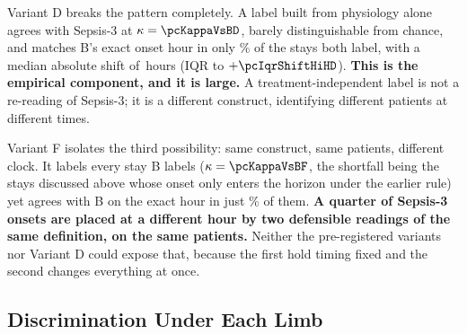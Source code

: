 Variant D breaks the pattern completely. A label built from physiology alone
agrees with Sepsis-3 at $\kappa = \pcKappaVsBD$, barely distinguishable from
chance, and matches B's exact onset hour in only \pcPctExactMatchD\% of the
stays both label, with a median absolute shift of \pcMedianAbsShiftHD\,hours
(IQR \pcIqrShiftLoHD{} to $+\pcIqrShiftHiHD$). \textbf{This is the empirical
component, and it is large.} A treatment-independent label is not a re-reading
of Sepsis-3; it is a different construct, identifying different patients at
different times.

Variant F isolates the third possibility: same construct, same patients,
different clock. It labels every stay B labels ($\kappa = \pcKappaVsBF$, the
shortfall being the \pcFNExtraInHorizon{} stays discussed above whose onset only
enters the horizon under the earlier rule) yet agrees with B on the exact hour
in just \pcPctExactMatchF\% of them. \textbf{A quarter of Sepsis-3 onsets are
placed at a different hour by two defensible readings of the same definition, on
the same patients.} Neither the pre-registered variants nor Variant D could
expose that, because the first hold timing fixed and the second changes
everything at once.

\subsection{Discrimination Under Each Limb}

